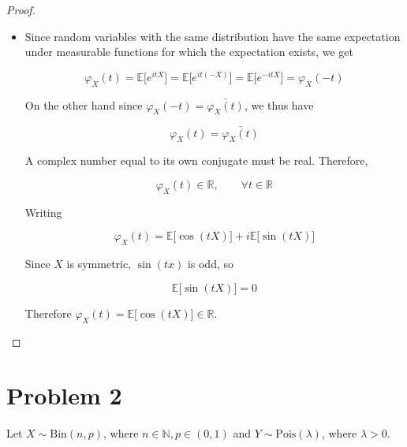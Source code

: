 \begin{proof}
\begin{itemize}
  Thus \(\mathit{\varphi}_{\mathit{X}}\) is differentiable and

  \[\mathit{\varphi}_{\mathit{X}}'(\mathit{t}) = \mathit{i}\mathbb{E}\lbrack\mathit{X}\mathit{e}^{\mathit{i}\mathit{t}\mathit{X}}\rbrack\]
\item
  Since random variables with the same distribution have the same expectation under measurable functions for which the expectation exists, we get

  \[\mathit{\varphi}_{\mathit{X}}(\mathit{t}) = \mathbb{E}\lbrack\mathit{e}^{\mathit{i}\mathit{t}\mathit{X}}\rbrack = \mathbb{E}\lbrack\mathit{e}^{\mathit{i}\mathit{t}( - \mathit{X})}\rbrack = \mathbb{E}\lbrack\mathit{e}^{- \mathit{i}\mathit{t}\mathit{X}}\rbrack = \mathit{\varphi}_{\mathit{X}}( - \mathit{t})\]

  On the other hand since \(\mathit{\varphi}_{\mathit{X}}( - \mathit{t}) = \bar{\mathit{\varphi}_{\mathit{X}}(\mathit{t})}\), we thus have

  \[\mathit{\varphi}_{\mathit{X}}(\mathit{t}) = \bar{\mathit{\varphi}_{\mathit{X}}(\mathit{t})}\]

  A complex number equal to its own conjugate must be real. Therefore,

  \[\mathit{\varphi}_{\mathit{X}}(\mathit{t}) \in \mathbb{R},\qquad\forall\mathit{t} \in \mathbb{R}\]

  Writing

  \[\mathit{\varphi}_{\mathit{X}}(\mathit{t}) = \mathbb{E}\lbrack\cos(\mathit{t}\mathit{X})\rbrack + \mathit{i}\mathbb{E}\lbrack\sin(\mathit{t}\mathit{X})\rbrack\]

  Since \(\mathit{X}\) is symmetric, \(\sin(\mathit{t}\mathit{x})\) is odd, so

  \[\mathbb{E}\lbrack\sin(\mathit{t}\mathit{X})\rbrack = 0\]

  Therefore \(\mathit{\varphi}_{\mathit{X}}(\mathit{t}) = \mathbb{E}\lbrack\cos(\mathit{t}\mathit{X})\rbrack \in \mathbb{R}\).
\end{itemize}

\end{proof}

\section{Problem 2}\label{hw06-problem-2}

Let \(\mathit{X} \sim \text{Bin}(\mathit{n},\mathit{p})\), where \(\mathit{n} \in \mathbb{N},\mathit{p} \in (0,1)\) and \(\mathit{Y} \sim \text{Pois}(\mathit{\lambda})\), where \(\mathit{\lambda} > 0\).

